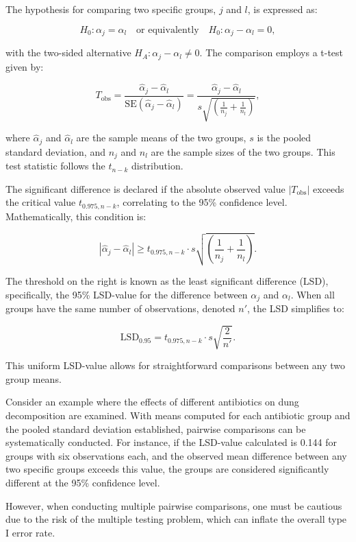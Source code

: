 \documentclass{article}
\begin{document}
The hypothesis for comparing two specific groups, $j$ and $l$, is expressed as:

\[
H_{0}: \alpha_{j} = \alpha_{l} \quad \text{or equivalently} \quad H_{0}: \alpha_{j} - \alpha_{l} = 0,
\]

with the two-sided alternative $H_{A}: \alpha_{j} - \alpha_{l} \neq 0$. The comparison employs a t-test given by:

\[
T_{\text{obs}} = \frac{\hat{\alpha}_{j} - \hat{\alpha}_{l}}{\mathrm{SE}(\hat{\alpha}_{j} - \hat{\alpha}_{l})} = \frac{\hat{\alpha}_{j} - \hat{\alpha}_{l}}{s \sqrt{\left(\frac{1}{n_{j}} + \frac{1}{n_{l}}\right)}},
\]

where $\hat{\alpha}_{j}$ and $\hat{\alpha}_{l}$ are the sample means of the two groups, $s$ is the pooled standard deviation, and $n_j$ and $n_l$ are the sample sizes of the two groups. This test statistic follows the $t_{n-k}$ distribution.

The significant difference is declared if the absolute observed value $|T_{\text{obs}}|$ exceeds the critical value $t_{0.975, n-k}$, correlating to the 95\% confidence level. Mathematically, this condition is:

\[
|\hat{\alpha}_{j} - \hat{\alpha}_{l}| \geq t_{0.975, n-k} \cdot s \sqrt{\left(\frac{1}{n_{j}} + \frac{1}{n_{l}}\right)}.
\]

The threshold on the right is known as the least significant difference (LSD), specifically, the 95\% LSD-value for the difference between $\alpha_j$ and $\alpha_l$. When all groups have the same number of observations, denoted $n'$, the LSD simplifies to:

\[
\text{LSD}_{0.95} = t_{0.975, n-k} \cdot s \sqrt{\frac{2}{n'}}.
\]

This uniform LSD-value allows for straightforward comparisons between any two group means.

Consider an example where the effects of different antibiotics on dung decomposition are examined. With means computed for each antibiotic group and the pooled standard deviation established, pairwise comparisons can be systematically conducted. For instance, if the LSD-value calculated is 0.144 for groups with six observations each, and the observed mean difference between any two specific groups exceeds this value, the groups are considered significantly different at the 95\% confidence level.

However, when conducting multiple pairwise comparisons, one must be cautious due to the risk of the multiple testing problem, which can inflate the overall type I error rate.
\end{document}
